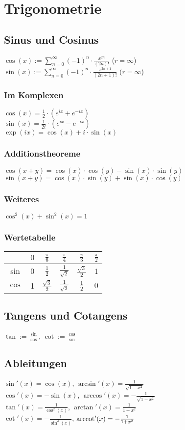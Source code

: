 \section*{Trigonometrie}

\subsection*{Sinus und Cosinus}
$\displaystyle \cos(x) := \sum_{n=0}^\infty (-1)^n\cdot\frac{x^{2n}}{(2n)!}$ ($r=\infty$) \\
$\displaystyle \sin(x) := \sum_{n=0}^\infty (-1)^n\cdot\frac{x^{2n+1}}{(2n+1)!}$ ($r=\infty$)

\subsubsection*{Im Komplexen}
$\cos(x)=\frac{1}{2}\cdot(e^{ix}+e^{-ix})$ \\
$\sin(x)=\frac{1}{2i}\cdot(e^{ix}-e^{-ix})$ \\
$\exp(ix)=\cos(x)+i\cdot\sin(x)$

\subsubsection*{Additionstheoreme}
$\cos(x+y)=\cos(x)\cdot\cos(y)-\sin(x)\cdot\sin(y)$\\
$\sin(x+y)=\cos(x)\cdot\sin(y)+\sin(x)\cdot\cos(y)$

\subsubsection*{Weiteres}
$\cos^2(x)+\sin^2(x)=1$

\subsubsection*{Wertetabelle}
\begin{tabular}{c|c|c|c|c|c}
	  & $0$ & $\frac{\pi}{6}$ & $\frac{\pi}{4}$ & $\frac{\pi}{3}$ & $\frac{\pi}{2}$ \\ \midrule
	$\sin$ & $0$ & $\frac{1}{2}$ & $\frac{1}{\sqrt{2}}$ & $\frac{\sqrt{3}}{2}$ & $1$ \\
	$\cos$ & 1 & $\frac{\sqrt{3}}{2}$ & $\frac{1}{\sqrt{2}}$ & $\frac{1}{2}$ & $0$ \\
\end{tabular}

\subsection*{Tangens und Cotangens}
$\tan := \frac{\sin}{\cos}$, $\cot := \frac{\cos}{\sin}$

\subsection*{Ableitungen}
$\sin'(x)=\cos(x)$, $\arcsin'(x)=\frac{1}{\sqrt{1-x^2}}$ \\
$\cos'(x)=-\sin(x)$, $\arccos'(x)=-\frac{1}{\sqrt{1-x^2}}$ \\
$\tan'(x)=\frac{1}{\cos^2(x)}$, $\arctan'(x)=\frac{1}{1+x^2}$ \\
$\cot'(x)=-\frac{1}{\sin^2(x)}$, $\operatorname{arccot}'(x)=-\frac{1}{1+x^2}$
